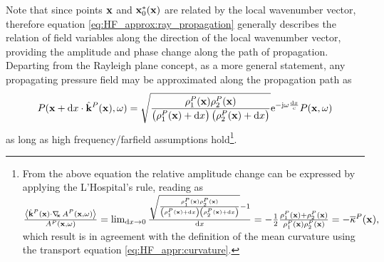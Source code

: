 Note that since points $\mathbf{x}$ and $\mathbf{x}_0^*(\mathbf{x})$ are related by the local wavenumber vector, therefore equation \eqref{eq:HF_approx:ray_propagation} generally describes the relation of field variables along the direction of the local wavenumber vector, providing the amplitude and phase change along the path of propagation.
Departing from the Rayleigh plane concept, as a more general statement, any propagating pressure field may be approximated along the propagation path as
\begin{equation}
\small
P(\mathbf{x}+\mathrm{d} x \cdot \hat{\mathbf{k}}^P(\mathbf{x}),\omega) =
\sqrt{ \frac{ \rho_1^P(\mathbf{x}) \rho_2^P(\mathbf{x}) }{ \left(\rho_1^P(\mathbf{x}) + \mathrm{d} x \right) \left(\rho_2^P(\mathbf{x}) + \mathrm{d} x\right) } }
\mathrm{e}^{-\mathrm{j} \omega \frac{\mathrm{d} x}{c} } P(\mathbf{x},\omega)
\end{equation}
as long as high frequency/farfield assumptions hold\footnote{From the above equation the relative amplitude change can be expressed by applying the L'Hospital's rule, reading as
$\small
\frac{\left< \hat{\mathbf{k}}^P(\mathbf{x}) \cdot \nabla_{\!\!\mathbf{x}}\, A^P(\mathbf{x},\omega) \right>}{A^P(\mathbf{x},\omega)} = \lim_{\mathrm{d} x \rightarrow 0} 
\frac{\sqrt{ \frac{ \rho_1^P(\mathbf{x}) \rho_2^P(\mathbf{x}) }{ \left(\rho_1^P(\mathbf{x}) + \mathrm{d} x \right) \left(\rho_2^P(\mathbf{x}) + \mathrm{d} x\right) } }-1}{\mathrm{d} x}
= 
-\frac{1}{2}\frac{\rho_1^P(\mathbf{x}) + \rho_2^P(\mathbf{x})}{\rho_1^P(\mathbf{x}) \rho_2^P(\mathbf{x})} = -\overline{\kappa}^P(\mathbf{x}),
$%
which result is in agreement with the definition of the mean curvature using the transport equation \eqref{eq:HF_appr:curvature}.}.


